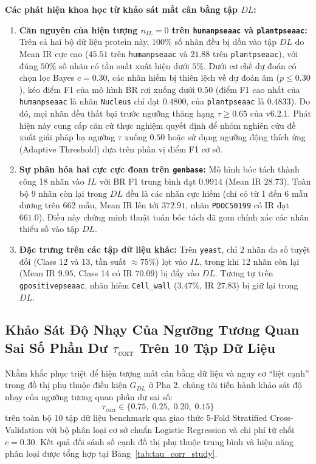 \documentclass[10pt,a4paper,twoside]{article}
\begin{document}
\noindent\textbf{Các phát hiện khoa học từ khảo sát mất cân bằng tập $DL$:}
\begin{enumerate}[leftmargin=*]
    \item \textbf{Căn nguyên của hiện tượng $n_{IL} = 0$ trên \texttt{humanpseaac} và \texttt{plantpseaac}:} Trên cả hai bộ dữ liệu protein này, $100\%$ số nhãn đều bị dồn vào tập $DL$ do Mean IR cực cao ($45.51$ trên \texttt{humanpseaac} và $21.88$ trên \texttt{plantpseaac}), với đúng $50\%$ số nhãn có tần suất xuất hiện dưới $5\%$. Dưới cơ chế dự đoán có chọn lọc Bayes $c = 0.30$, các nhãn hiếm bị thiên lệch về dự đoán âm ($p \le 0.30$), kéo điểm F1 của mô hình BR rơi xuống dưới $0.50$ (điểm F1 cao nhất của \texttt{humanpseaac} là nhãn \texttt{Nucleus} chỉ đạt $0.4800$, của \texttt{plantpseaac} là $0.4833$). Do đó, mọi nhãn đều thất bại trước ngưỡng thăng hạng $\tau \ge 0.65$ của v6.2.1. Phát hiện này cung cấp căn cứ thực nghiệm quyết định để nhóm nghiên cứu đề xuất giải pháp hạ ngưỡng $\tau$ xuống $0.50$ hoặc sử dụng ngưỡng động thích ứng (Adaptive Threshold) dựa trên phân vị điểm F1 cơ sở.
    \item \textbf{Sự phân hóa hai cực cực đoan trên \texttt{genbase}:} Mô hình bóc tách thành công 18 nhãn vào $IL$ với BR F1 trung bình đạt $0.9914$ (Mean IR $28.73$). Toàn bộ 9 nhãn còn lại trong $DL$ đều là các nhãn cực hiếm (chỉ có từ 1 đến 6 mẫu dương trên 662 mẫu, Mean IR lên tới $372.91$, nhãn \texttt{PDOC50199} có IR đạt $661.0$). Điều này chứng minh thuật toán bóc tách đã gom chính xác các nhãn thiểu số vào tập $DL$.
    \item \textbf{Đặc trưng trên các tập dữ liệu khác:} Trên \texttt{yeast}, chỉ 2 nhãn đa số tuyệt đối (Class 12 và 13, tần suất $\approx 75\%$) lọt vào $IL$, trong khi 12 nhãn còn lại (Mean IR $9.95$, Class 14 có IR $70.09$) bị đẩy vào $DL$. Tương tự trên \texttt{gpositivepseaac}, nhãn hiếm \texttt{Cell\_wall} ($3.47\%$, IR $27.83$) bị giữ lại trong $DL$.
\end{enumerate}

\subsection{Khảo Sát Độ Nhạy Của Ngưỡng Tương Quan Sai Số Phần Dư $\tau_{\text{corr}}$ Trên 10 Tập Dữ Liệu}
Nhằm khắc phục triệt để hiện tượng mất cân bằng dữ liệu và nguy cơ ``liệt cạnh'' trong đồ thị phụ thuộc điều kiện $G_{DL}$ ở Pha 2, chúng tôi tiến hành khảo sát độ nhạy của ngưỡng tương quan phần dư sai số:
\begin{equation}
\tau_{\text{corr}} \in \{0.75, \; 0.25, \; 0.20, \; 0.15\}
\end{equation}
trên toàn bộ 10 tập dữ liệu benchmark qua giao thức 5-Fold Stratified Cross-Validation với bộ phân loại cơ sở chuẩn Logistic Regression và chi phí từ chối $c = 0.30$. Kết quả đối sánh số cạnh đồ thị phụ thuộc trung bình và hiệu năng phân loại được tổng hợp tại Bảng~\ref{tab:tau_corr_study}.
\end{document}
